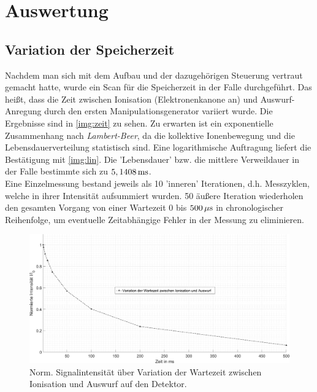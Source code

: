 \documentclass[numbers=noenddot,a4paper,notitlepage,twoside,BCOR15mm]{scrartcl}
\newcommand{\tilt}[1]{\textit{#1}}
\begin{document}
	
	
	\newpage
		\section{Auswertung}
		
		\subsection{Variation der Speicherzeit}
		
		Nachdem man sich mit dem Aufbau und der dazugehörigen Steuerung vertraut gemacht hatte, wurde ein Scan für die Speicherzeit in der Falle durchgeführt. Das heißt, dass die Zeit zwischen Ionisation (Elektronenkanone an) und Auswurf-Anregung durch den ersten Manipulationsgenerator variiert wurde. Die Ergebnisse sind in \autoref{img:zeit} zu sehen. Zu erwarten ist ein exponentielle Zusammenhang nach \tilt{Lambert-Beer}, da die kollektive Ionenbewegung und die Lebensdauerverteilung statistisch sind. Eine logarithmische Auftragung liefert die Bestätigung mit \autoref{img:lin}. Die 'Lebensdauer' bzw. die mittlere Verweildauer in der Falle bestimmte sich zu $\unit[5,1408]{ms}$.\\
		Eine Einzelmessung bestand jeweils als 10 'inneren' Iterationen, d.h. Messzyklen, welche in ihrer Intensität aufsummiert wurden. 50 äußere Iteration wiederholen den gesamten Vorgang von einer Wartezeit 0 bis $\unit[500]{\mu s}$ in chronologischer Reihenfolge, um eventuelle Zeitabhängige Fehler in der Messung zu eliminieren.
		
		\begin{figure}
			\includegraphics[width=\textwidth]{pics/wartezeit.png}
			\caption{Norm. Signalintensität über Variation der Wartezeit zwischen Ionisation und Auswurf auf den Detektor.}\label{img:zeit}
		\end{figure}
		
\end{document}
